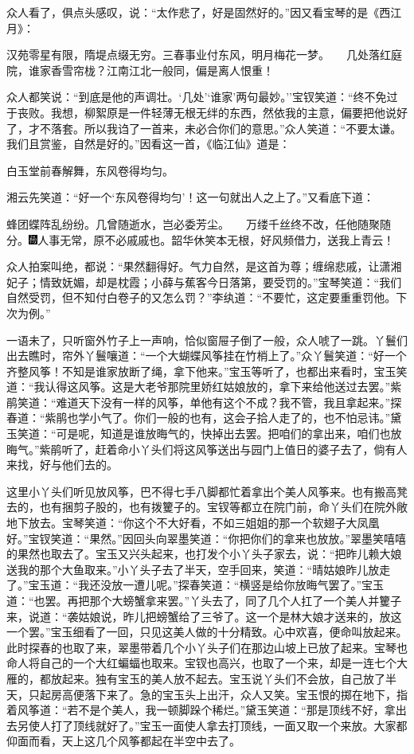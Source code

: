 众人看了，俱点头感叹，说：``太作悲了，好是固然好的。''因又看宝琴的是《西江月》：

汉苑零星有限，隋堤点缀无穷。三春事业付东风，明月梅花一梦。　　几处落红庭院，谁家香雪帘栊？江南江北一般同，偏是离人恨重！

众人都笑说：``到底是他的声调壮。`几处'`谁家'两句最妙。''宝钗笑道：``终不免过于丧败。我想，柳絮原是一件轻薄无根无绊的东西，然依我的主意，偏要把他说好了，才不落套。所以我诌了一首来，未必合你们的意思。''众人笑道：``不要太谦。我们且赏鉴，自然是好的。''因看这一首，《临江仙》道是：

白玉堂前春解舞，东风卷得均匀。

湘云先笑道：``好一个`东风卷得均匀'！这一句就出人之上了。''又看底下道：

蜂团蝶阵乱纷纷。几曾随逝水，岂必委芳尘。　　万缕千丝终不改，任他随聚随分。{\includegraphics[width=3mm]{../Images/00008}\footnotesize \kaishu 人事无常，原不必戚戚也。}韶华休笑本无根，好风频借力，送我上青云！

众人拍案叫绝，都说：``果然翻得好。气力自然，是这首为尊；缠绵悲戚，让潇湘妃子；情致妩媚，却是枕霞；小薛与蕉客今日落第，要受罚的。''宝琴笑道：``我们自然受罚，但不知付白卷子的又怎么罚？''李纨道：``不要忙，这定要重重罚他。下次为例。''

一语未了，只听窗外竹子上一声响，恰似窗屉子倒了一般，众人唬了一跳。丫鬟们出去瞧时，帘外丫鬟嚷道：``一个大蝴蝶风筝挂在竹梢上了。''众丫鬟笑道：``好一个齐整风筝！不知是谁家放断了绳，拿下他来。''宝玉等听了，也都出来看时，宝玉笑道：``我认得这风筝。这是大老爷那院里娇红姑娘放的，拿下来给他送过去罢。''紫鹃笑道：``难道天下没有一样的风筝，单他有这个不成？我不管，我且拿起来。''探春道：``紫鹃也学小气了。你们一般的也有，这会子拾人走了的，也不怕忌讳。''黛玉笑道：``可是呢，知道是谁放晦气的，快掉出去罢。把咱们的拿出来，咱们也放晦气。''紫鹃听了，赶着命小丫头们将这风筝送出与园门上值日的婆子去了，倘有人来找，好与他们去的。

这里小丫头们听见放风筝，巴不得七手八脚都忙着拿出个美人风筝来。也有搬高凳去的，也有捆剪子股的，也有拨籰子的。宝钗等都立在院门前，命丫头们在院外敞地下放去。宝琴笑道：``你这个不大好看，不如三姐姐的那一个软翅子大凤凰好。''宝钗笑道：``果然。''因回头向翠墨笑道：``你把你们的拿来也放放。''翠墨笑嘻嘻的果然也取去了。宝玉又兴头起来，也打发个小丫头子家去，说：``把昨儿赖大娘送我的那个大鱼取来。''小丫头子去了半天，空手回来，笑道：``晴姑娘昨儿放走了。''宝玉道：``我还没放一遭儿呢。''探春笑道：``横竖是给你放晦气罢了。''宝玉道：``也罢。再把那个大螃蟹拿来罢。''丫头去了，同了几个人扛了一个美人并籰子来，说道：``袭姑娘说，昨儿把螃蟹给了三爷了。这一个是林大娘才送来的，放这一个罢。''宝玉细看了一回，只见这美人做的十分精致。心中欢喜，便命叫放起来。此时探春的也取了来，翠墨带着几个小丫头子们在那边山坡上已放了起来。宝琴也命人将自己的一个大红蝙蝠也取来。宝钗也高兴，也取了一个来，却是一连七个大雁的，都放起来。独有宝玉的美人放不起去。宝玉说丫头们不会放，自己放了半天，只起房高便落下来了。急的宝玉头上出汗，众人又笑。宝玉恨的掷在地下，指着风筝道：``若不是个美人，我一顿脚跺个稀烂。''黛玉笑道：``那是顶线不好，拿出去另使人打了顶线就好了。''宝玉一面使人拿去打顶线，一面又取一个来放。大家都仰面而看，天上这几个风筝都起在半空中去了。

